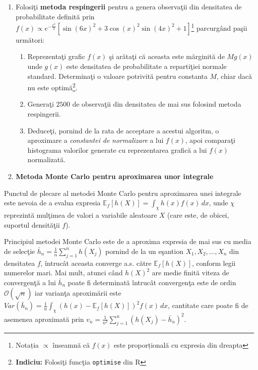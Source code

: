 \documentclass[]{article}
\let\rmarkdownfootnote\footnote%
\def\footnote{\protect\rmarkdownfootnote}
\begin{document}
\begin{enumerate}
\def\labelenumi{\arabic{enumi}.}
\setcounter{enumi}{1}
\item
  Folosiţi \textbf{metoda respingerii} pentru a genera observaţii din
  densitatea de probabilitate definită prin
  \(f(x)\propto e^{-\frac{x^2}{2}}\left[\sin(6x)^2+3\cos(x)^2\sin(4x)^2+1\right]\)\footnote{Notația
    \(\propto\) înseamnă că \(f(x)\) este proporțională cu expresia din
    dreapta} parcurgând paşii următori:

  \begin{enumerate}
  \def\labelenumii{\alph{enumii})}
  \item
    Reprezentaţi grafic \(f(x)\) şi arătaţi că aceasta este mărginită de
    \(Mg(x)\) unde \(g(x)\) este densitatea de probabilitate a
    repartiţiei normale standard. Determinaţi o valoare potrivită pentru
    constanta \(M\), chiar dacă nu este optimă\footnote{\textbf{Indiciu:}
      Folosiţi funcţia \texttt{optimise} din R}.
  \item
    Generaţi \(2500\) de observaţii din densitatea de mai sus folosind
    metoda respingerii.
  \item
    Deduceţi, pornind de la rata de acceptare a acestui algoritm, o
    aproximare a \emph{constantei de normalizare} a lui \(f(x)\), apoi
    comparaţi histograma valorilor generate cu reprezentarea grafică a
    lui \(f(x)\) normalizată.
  \end{enumerate}
\item
  \textbf{Metoda Monte Carlo pentru aproximarea unor integrale}
\end{enumerate}

Punctul de plecare al metodei Monte Carlo pentru aproximarea unei
integrale este nevoia de a evalua expresia
\(\mathbb{E}_{f}[h(X)] = \int_{\chi}h(x)f(x)\,dx\), unde \(\chi\)
reprezintă mulţimea de valori a variabile aleatoare \(X\) (care este, de
obicei, suportul densităţii \(f\)).

Principiul metodei Monte Carlo este de a aproxima expresia de mai sus cu
media de selecţie \(\bar{h}_n = \frac{1}{n}\sum_{j = 1}^{n}h(X_j)\)
pornind de la un eşantion \(X_1,X_2,\ldots,X_n\) din densitatea \(f\),
întrucât aceasta converge a.s. către \(\mathbb{E}_{f}[h(X)]\), conform
legii numerelor mari. Mai mult, atunci când \(h(X)^2\) are medie finită
viteza de convergenţă a lui \(\bar{h}_n\) poate fi determinată întrucât
convergenţa este de ordin \(\mathcal{O}(\sqrt{n})\) iar varianţa
aproximării este
\(Var(\bar{h}_n) = \frac{1}{n}\int_{\chi}\left(h(x) - \mathbb{E}_{f}[h(X)]\right)^2f(x)\,dx\),
cantitate care poate fi de asemenea aproximată prin
\(v_n = \frac{1}{n^2}\sum_{j=1}^{n}\left(h(X_j) - \bar{h}_n\right)^2\).
\end{document}
